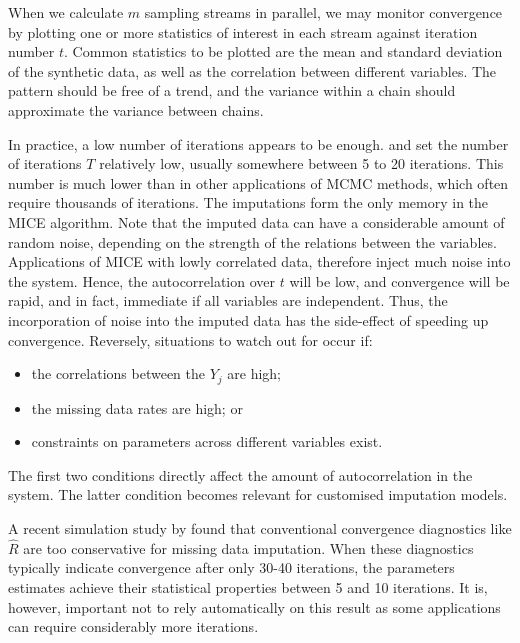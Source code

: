 \documentclass[
]{book}
\providecommand{\tightlist}{%
  \setlength{\itemsep}{0pt}\setlength{\parskip}{0pt}}
\begin{document}
When we calculate \(m\) sampling streams in parallel, we may monitor convergence by plotting one or more statistics of interest in each stream against iteration number \(t\). Common statistics to be plotted are the mean and standard deviation of the synthetic data, as well as the correlation between different variables. The pattern should be free of a trend, and the variance within a chain should approximate the variance between chains.

In practice, a low number of iterations appears to be enough. \citet{BRAND1999} and \citet{VANBUUREN1999} set the number of iterations \(T\) relatively low, usually somewhere between 5 to 20 iterations. This number is much lower than in other applications of MCMC methods, which often require thousands of iterations. The imputations form the only memory in the MICE algorithm. Note that the imputed data can have a considerable amount of random noise, depending on the strength of the relations between the variables. Applications of MICE with lowly correlated data, therefore inject much noise into the system. Hence, the autocorrelation over \(t\) will be low, and convergence will be rapid, and in fact, immediate if all variables are independent. Thus, the incorporation of noise into the imputed data has the side-effect of speeding up convergence. Reversely, situations to watch out for occur if:

\begin{itemize}
\tightlist
\item
  the correlations between the \(Y_j\) are high;
\item
  the missing data rates are high; or
\item
  constraints on parameters across different variables exist.
\end{itemize}

The first two conditions directly affect the amount of autocorrelation in the system. The latter condition becomes relevant for customised imputation models.

A recent simulation study by \citet{OBERMAN2020} found that conventional convergence diagnostics like \(\hat R\) \citep{GELMAN1991} are too conservative for missing data imputation. When these diagnostics typically indicate convergence after only 30-40 iterations, the parameters estimates achieve their statistical properties between 5 and 10 iterations. It is, however, important not to rely automatically on this result as some applications can require considerably more iterations.
\end{document}
